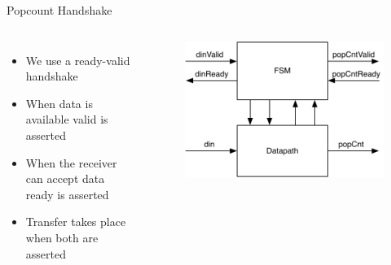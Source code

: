 \begin{frame}[fragile]{Popcount Handshake}
\begin{columns}
\begin{itemize}
\item We use a ready-valid handshake
\item When data is available valid is asserted
\item When the receiver can accept data ready is asserted
\item Transfer takes place when both are asserted
\end{itemize}
\begin{figure}
  \includegraphics[scale=0.45]{../figures/popcnt-fsmd}
\end{figure}
\end{columns}
\end{frame}


